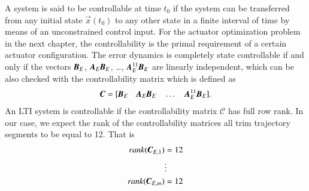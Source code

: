 A system is said to be controllable at time $t_{0}$ if the system can be transferred from any initial state $\vec{x}(t_{0})$ to any other state in a finite interval of time by means of an unconstrained control input. 
For the actuator optimization problem in the next chapter, the controllability is the primal requirement of a certain actuator configuration. The error dynamics is completely state controllable if and only if the vectors $\textbf{\emph{B}}_{E}$, $\textbf{\emph{A}}_{E}\textbf{\emph{B}}_{E}$, \ldots, $\textbf{\emph{A}}_{E}^{11}\textbf{\emph{B}}_{E}$ are linearly independent, which can be also checked with the controllability matrix which is defined as
\begin{align}
\emph{\textbf{C}}=[\textbf{\emph{B}}_{E} \quad \textbf{\emph{A}}_{E}\textbf{\emph{B}}_{E} \quad \ldots \quad \textbf{\emph{A}}_{E}^{11}\textbf{\emph{B}}_{E}].
\end{align}
An LTI system is controllable if the controllability matrix $\mathcal{C}$ has full row rank. In our case, we expect the rank of the controllability matrices all trim trajectory segments to be equal to 12. That is 
\begin{align}
rank(\emph{\textbf{C}}_{E,1})&=12 \nonumber \\
& \vdots \nonumber \\
rank(\emph{\textbf{C}}_{E,m})&=12
\end{align}
